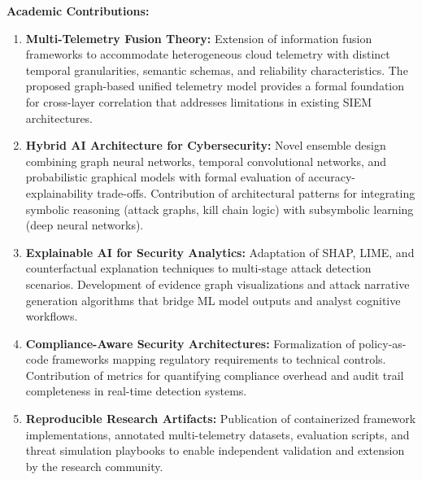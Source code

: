 \textbf{Academic Contributions:}
\begin{enumerate}
    \item \textbf{Multi-Telemetry Fusion Theory:} Extension of information fusion frameworks to accommodate heterogeneous cloud telemetry with distinct temporal granularities, semantic schemas, and reliability characteristics. The proposed graph-based unified telemetry model provides a formal foundation for cross-layer correlation that addresses limitations in existing SIEM architectures.
    \item \textbf{Hybrid AI Architecture for Cybersecurity:} Novel ensemble design combining graph neural networks, temporal convolutional networks, and probabilistic graphical models with formal evaluation of accuracy-explainability trade-offs. Contribution of architectural patterns for integrating symbolic reasoning (attack graphs, kill chain logic) with subsymbolic learning (deep neural networks).
    \item \textbf{Explainable AI for Security Analytics:} Adaptation of SHAP, LIME, and counterfactual explanation techniques to multi-stage attack detection scenarios. Development of evidence graph visualizations and attack narrative generation algorithms that bridge ML model outputs and analyst cognitive workflows.
    \item \textbf{Compliance-Aware Security Architectures:} Formalization of policy-as-code frameworks mapping regulatory requirements to technical controls. Contribution of metrics for quantifying compliance overhead and audit trail completeness in real-time detection systems.
    \item \textbf{Reproducible Research Artifacts:} Publication of containerized framework implementations, annotated multi-telemetry datasets, evaluation scripts, and threat simulation playbooks to enable independent validation and extension by the research community.
\end{enumerate}

